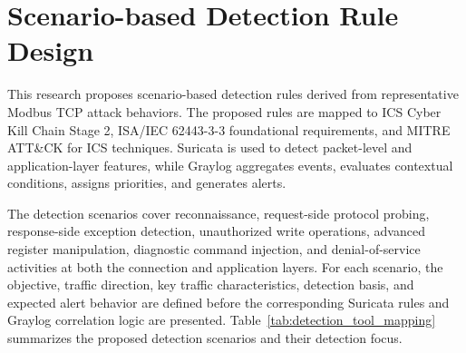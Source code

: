 \newpage

\section{Scenario-based Detection Rule Design}
This research proposes scenario-based detection rules derived from representative Modbus TCP attack behaviors. The proposed rules are mapped to ICS Cyber Kill Chain Stage 2, ISA/IEC 62443-3-3 foundational requirements, and MITRE ATT\&CK for ICS techniques. Suricata is used to detect packet-level and application-layer features, while Graylog aggregates events, evaluates contextual conditions, assigns priorities, and generates alerts.

The detection scenarios cover reconnaissance, request-side protocol probing, response-side exception detection, unauthorized write operations, advanced register manipulation, diagnostic command injection, and denial-of-service activities at both the connection and application layers. For each scenario, the objective, traffic direction, key traffic characteristics, detection basis, and expected alert behavior are defined before the corresponding Suricata rules and Graylog correlation logic are presented. Table~\ref{tab:detection_tool_mapping} summarizes the proposed detection scenarios and their detection focus.
